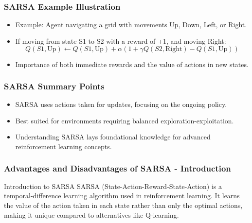 \documentclass[aspectratio=169]{beamer}
\begin{document}
\begin{frame}[fragile]
    \frametitle{SARSA Example Illustration}
    \begin{itemize}
        \item Example: Agent navigating a grid with movements Up, Down, Left, or Right.
        \item If moving from state S1 to S2 with a reward of +1, and moving Right:
        \begin{equation}
            Q(S1, \text{Up}) \leftarrow Q(S1, \text{Up}) + \alpha \left( 1 + \gamma Q(S2, \text{Right}) - Q(S1, \text{Up}) \right)
        \end{equation}
        \item Importance of both immediate rewards and the value of actions in new states.
    \end{itemize}
\end{frame}

\begin{frame}[fragile]
    \frametitle{SARSA Summary Points}
    \begin{itemize}
        \item SARSA uses actions taken for updates, focusing on the ongoing policy.
        \item Best suited for environments requiring balanced exploration-exploitation.
        \item Understanding SARSA lays foundational knowledge for advanced reinforcement learning concepts.
    \end{itemize}
\end{frame}

\begin{frame}[fragile]
    \frametitle{Advantages and Disadvantages of SARSA - Introduction}
    \begin{block}{Introduction to SARSA}
        SARSA (State-Action-Reward-State-Action) is a temporal-difference learning algorithm used in reinforcement learning. 
        It learns the value of the action taken in each state rather than only the optimal actions, making it unique compared to alternatives like Q-learning.
    \end{block}
\end{frame}
\end{document}

